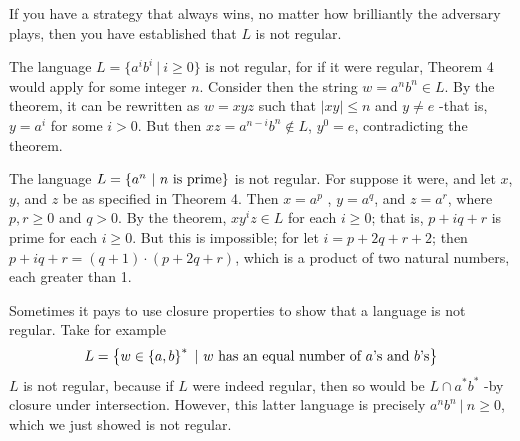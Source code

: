 If you have a strategy that always wins, no matter how brilliantly the adversary plays, then you have established that $L$ is not regular.

\begin{example}{}
  The language $L = \{a^ib^i\ |\ i \geq 0\}$ is not regular, for if it were regular, Theorem 4 would apply for some integer $n$. Consider then the string $w = a^nb^n \in L$. By the theorem, it can be rewritten as $w = xyz$ such that $|xy| \leq n$ and $y \neq e$ -that is, $y = a^i$ for some $i > 0$. But then $xz = a^{n-i}b^n \notin L$, $y^0 = e$, contradicting the theorem.
\end{example}

\begin{example}{}
  The language $L = \{a^n\ |\ n \textnormal{ is prime}\}$ is not regular. For suppose it were, and let $x$, $y$, and $z$ be as specified in Theorem 4. Then $x = a^p$ , $y = a^q$, and $z = a^r$, where $p, r \geq 0$ and $q > 0$. By the theorem, $xy^iz \in L$ for each $i \geq 0$; that is, $p + iq + r$ is prime for each $i \geq 0$. But this is impossible; for let $i = p + 2q + r + 2$; then $p + iq + r = (q + 1) \cdot (p + 2q + r)$, which is a product of two natural numbers, each greater than 1.
\end{example}

\begin{example}{}
  Sometimes it pays to use closure properties to show that a language is not regular. Take for example
  \begin{equation*}
    L = \left\{ w \in \left\{ a, b \right\}^*\ |\ w \textnormal{ has an equal number of $a$'s and $b$'s} \right\}
  \end{equation*}
  $L$ is not regular, because if $L$ were indeed regular, then so would be $L \cap a^*b^*$ -by closure under intersection. However, this latter language is precisely ${a^nb^n\ |\ n \geq 0}$, which we just showed is not regular.
\end{example}
